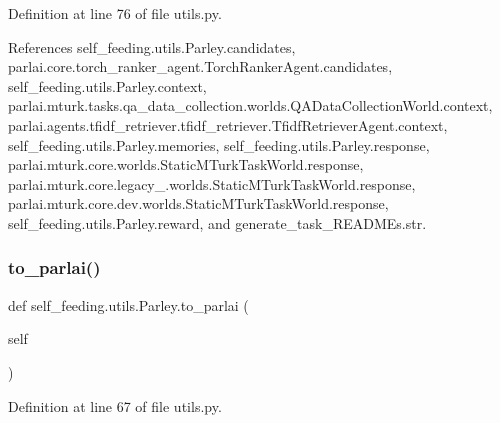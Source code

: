 Definition at line 76 of file utils.\+py.



References self\+\_\+feeding.\+utils.\+Parley.\+candidates, parlai.\+core.\+torch\+\_\+ranker\+\_\+agent.\+Torch\+Ranker\+Agent.\+candidates, self\+\_\+feeding.\+utils.\+Parley.\+context, parlai.\+mturk.\+tasks.\+qa\+\_\+data\+\_\+collection.\+worlds.\+Q\+A\+Data\+Collection\+World.\+context, parlai.\+agents.\+tfidf\+\_\+retriever.\+tfidf\+\_\+retriever.\+Tfidf\+Retriever\+Agent.\+context, self\+\_\+feeding.\+utils.\+Parley.\+memories, self\+\_\+feeding.\+utils.\+Parley.\+response, parlai.\+mturk.\+core.\+worlds.\+Static\+M\+Turk\+Task\+World.\+response, parlai.\+mturk.\+core.\+legacy\+\_.\+worlds.\+Static\+M\+Turk\+Task\+World.\+response, parlai.\+mturk.\+core.\+dev.\+worlds.\+Static\+M\+Turk\+Task\+World.\+response, self\+\_\+feeding.\+utils.\+Parley.\+reward, and generate\+\_\+task\+\_\+\+R\+E\+A\+D\+M\+Es.\+str.

\mbox{\label{classself__feeding_1_1utils_1_1Parley_a84e024a69f13007c1ba1ba1b93497ab5}} 
\subsubsection{\texorpdfstring{to\+\_\+parlai()}{to\_parlai()}}
{\footnotesize\ttfamily def self\+\_\+feeding.\+utils.\+Parley.\+to\+\_\+parlai (\begin{DoxyParamCaption}\item[{}]{self }\end{DoxyParamCaption})}



Definition at line 67 of file utils.\+py.



